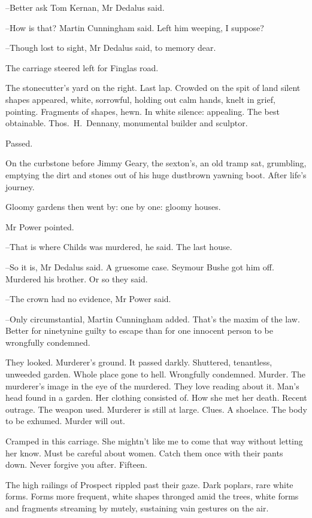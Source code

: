 --Better ask Tom Kernan,
Mr Dedalus said.

--How is that?
Martin Cunningham said.
Left him weeping, I suppose?

--Though lost to sight,
Mr Dedalus said,
to memory dear.

The carriage steered left for Finglas road.

The stonecutter's yard on the right.
Last lap.
Crowded on the spit of land
silent shapes appeared,
white, sorrowful, holding out calm hands,
knelt in grief, pointing.
Fragments of shapes, hewn.
In white silence:
appealing.
The best obtainable.
Thos.~H.~Dennany, monumental builder and sculptor.

Passed.

On the curbstone before Jimmy Geary, the sexton's,
an old tramp sat, grumbling,
emptying the dirt and stones out of his huge dustbrown yawning boot.
After life's journey.

Gloomy gardens then went by:
one by one:
gloomy houses.

Mr Power pointed.

--That is where Childs was murdered,
he said.
The last house.

--So it is,
Mr Dedalus said.
A gruesome case.
Seymour Bushe got him off.
Murdered his brother.
Or so they said.

--The crown had no evidence,
Mr Power said.

--Only circumstantial,
Martin Cunningham added.
That's the maxim of the law.
Better for ninetynine guilty to escape
than for one innocent person to be wrongfully condemned.

They looked.
Murderer's ground.
It passed darkly.
Shuttered, tenantless, unweeded garden.
Whole place gone to hell.
Wrongfully condemned.
Murder.
The murderer's image in the eye of the murdered.
They love reading about it.
Man's head found in a garden.
Her clothing consisted of.
How she met her death.
Recent outrage.
The weapon used.
Murderer is still at large.
Clues.
A shoelace.
The body to be exhumed.
Murder will out.

Cramped in this carriage.
She mightn't like me to come that way without letting her know.
Must be careful about women.
Catch them once with their pants down.
Never forgive you after.
Fifteen.

The high railings of Prospect rippled past their gaze.
Dark poplars, rare white forms.
Forms more frequent,
white shapes thronged amid the trees,
white forms and fragments streaming by mutely,
sustaining vain gestures on the air.

